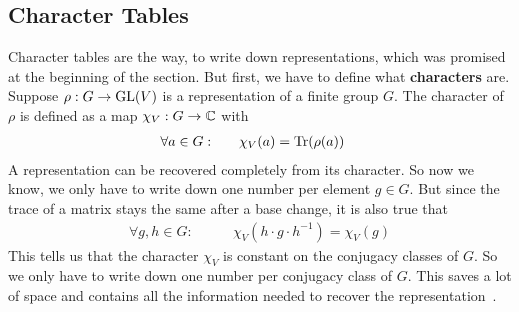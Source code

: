 \subsection{Character Tables}

Character tables are the way, to write down representations, which was promised at the beginning of the section.
But first, we have to define what \textbf{characters} are.
Suppose $\rho: G \to \operatorname{GL}(V)$ is a representation of a finite group $G$.
The character of $\rho$ is defined as a map $\chi_V: G \to \mathbb{C}$ with
\begin{align}
    \forall a \in G: \qquad & \chi_V(a) = \operatorname{Tr}(\rho(a))
\end{align}
A representation can be recovered completely from its character.
So now we know, we only have to write down one number per element $g \in G$.
But since the trace of a matrix stays the same after a base change, it is also true that
\begin{align}
    \forall g, h \in G: \qquad & \chi_V(h \cdot g \cdot h^{-1}) = \chi_V(g)
\end{align}
This tells us that the character $\chi_V$ is constant on the conjugacy classes of $G$.
So we only have to write down one number per conjugacy class of $G$.
This saves a lot of space and contains all the information needed to recover the representation~\cite{fulton2013}.
